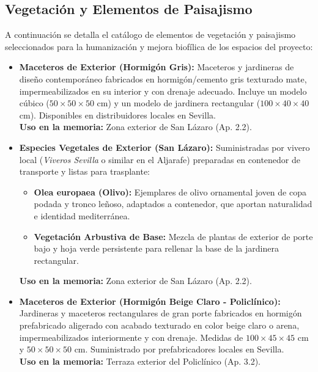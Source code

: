 \documentclass[12pt,a4paper]{article}
\begin{document}
\subsection{Vegetación y Elementos de Paisajismo} \label{sec:catalogo_vegetacion}
A continuación se detalla el catálogo de elementos de vegetación y paisajismo seleccionados para la humanización y mejora biofílica de los espacios del proyecto:
\begin{itemize}
    \item \textbf{Maceteros de Exterior (Hormigón Gris):} Maceteros y jardineras de diseño contemporáneo fabricados en hormigón/cemento gris texturado mate, impermeabilizados en su interior y con drenaje adecuado. Incluye un modelo cúbico ($50 \times 50 \times 50$ cm) y un modelo de jardinera rectangular ($100 \times 40 \times 40$ cm). Disponibles en distribuidores locales en Sevilla. \\ \textbf{Uso en la memoria:} Zona exterior de San Lázaro (Ap. 2.2).
    
    \item \textbf{Especies Vegetales de Exterior (San Lázaro):} Suministradas por vivero local (\textit{Viveros Sevilla} o similar en el Aljarafe) preparadas en contenedor de transporte y listas para trasplante:
    \begin{itemize}
        \item \textbf{Olea europaea (Olivo):} Ejemplares de olivo ornamental joven de copa podada y tronco leñoso, adaptados a contenedor, que aportan naturalidad e identidad mediterránea.
        \item \textbf{Vegetación Arbustiva de Base:} Mezcla de plantas de exterior de porte bajo y hoja verde persistente para rellenar la base de la jardinera rectangular.
    \end{itemize}
    \textbf{Uso en la memoria:} Zona exterior de San Lázaro (Ap. 2.2).
    
    \item \textbf{Maceteros de Exterior (Hormigón Beige Claro - Policlínico):} Jardineras y maceteros rectangulares de gran porte fabricados en hormigón prefabricado aligerado con acabado texturado en color beige claro o arena, impermeabilizados interiormente y con drenaje. Medidas de $100 \times 45 \times 45$ cm y $50 \times 50 \times 50$ cm. Suministrado por prefabricadores locales en Sevilla. \\ \textbf{Uso en la memoria:} Terraza exterior del Policlínico (Ap. 3.2).
    

\end{itemize}
\end{document}
